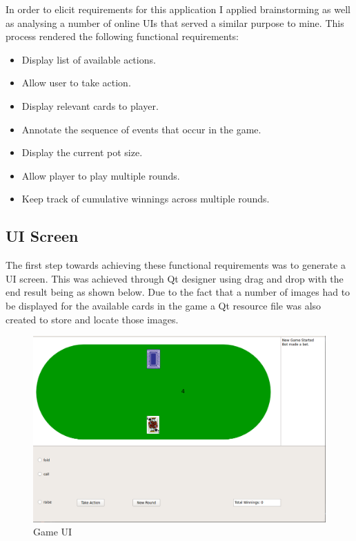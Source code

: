 In order to elicit requirements for this application I applied brainstorming as well as analysing a number
of online UIs that served a similar purpose to mine.
This process rendered the following functional requirements:
\begin{itemize}
    \item Display list of available actions.
    \item Allow user to take action.
    \item Display relevant cards to player.
    \item Annotate the sequence of events that occur in the game.
    \item Display the current pot size.
    \item Allow player to play multiple rounds.
    \item Keep track of cumulative winnings across multiple rounds.
\end{itemize}

\subsection{UI Screen}\label{subsec:UiScreen}
The first step towards achieving these functional requirements was to generate a UI screen.
This was achieved through Qt designer using drag and drop with the end result being as shown below.
Due to the fact that a number of images had to be displayed for the available cards in the
game a Qt resource file was also created to store and locate those images.

\begin{figure}[ht]
    \includegraphics[scale=.4]{images/UI_screenshot.png}
    \caption{Game UI}
\end{figure}

